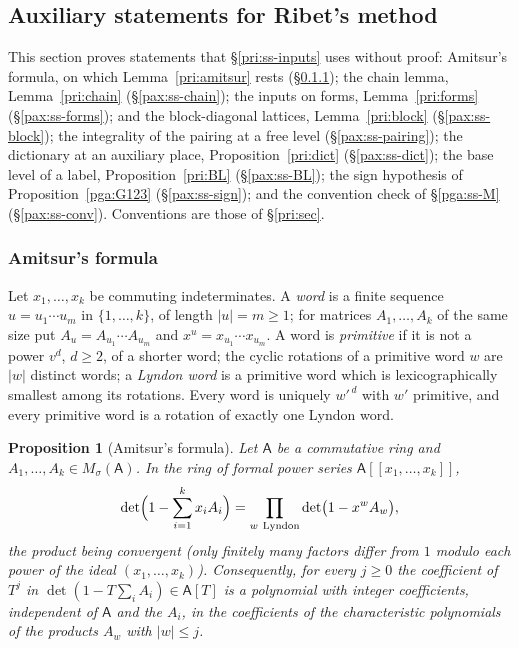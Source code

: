 \documentclass[10pt]{amsart}
\newtheorem{proposition}[theorem]{Proposition}
\theoremstyle{definition}
\theoremstyle{remark}
\begin{document}
\subsection{Auxiliary statements for Ribet's method}\label{pax:sec}

This section proves statements that \S\ref{pri:ss-inputs} uses without proof:
Amitsur's formula, on which Lemma~\ref{pri:amitsur} rests (\S\ref{pax:ss-amitsur}); the chain
lemma, Lemma~\ref{pri:chain} (\S\ref{pax:ss-chain}); the inputs on forms, Lemma~\ref{pri:forms}
(\S\ref{pax:ss-forms}); and the block-diagonal lattices, Lemma~\ref{pri:block}
(\S\ref{pax:ss-block}); the integrality of the pairing at a free level (\S\ref{pax:ss-pairing}); the
dictionary at an auxiliary place, Proposition~\ref{pri:dict} (\S\ref{pax:ss-dict}); the base level of a label,
Proposition~\ref{pri:BL} (\S\ref{pax:ss-BL}); the sign hypothesis of Proposition~\ref{pga:G123}
(\S\ref{pax:ss-sign}); and the convention check of \S\ref{pga:ss-M} (\S\ref{pax:ss-conv}). Conventions are those of \S\ref{pri:sec}.

\subsubsection{Amitsur's formula}\label{pax:ss-amitsur}

Let $x_1,\dots,x_k$ be commuting indeterminates. A \emph{word} is a finite sequence $u=u_1\cdots
u_m$ in $\{1,\dots,k\}$, of length $|u|=m\ge1$; for matrices $A_1,\dots,A_k$ of the same size put
$A_u=A_{u_1}\cdots A_{u_m}$ and $x^u=x_{u_1}\cdots x_{u_m}$. A word is \emph{primitive} if it is not
a power $v^d$, $d\ge2$, of a shorter word; the cyclic rotations of a primitive word $w$ are $|w|$
distinct words; a \emph{Lyndon word} is a primitive word which is lexicographically smallest among
its rotations. Every word is uniquely $w'^{\,d}$ with $w'$ primitive, and every primitive word is a
rotation of exactly one Lyndon word.

\begin{proposition}[Amitsur's formula]\label{pax:amitsur}
Let $\mathsf A$ be a commutative ring and $A_1,\dots,A_k\in M_\sigma(\mathsf A)$. In the ring of
formal power series $\mathsf A[[x_1,\dots,x_k]]$,
\begin{equation}\label{pax:eq-amitsur}
\det\Bigl(1-\sum_{i=1}^kx_iA_i\Bigr)=\prod_{w\ \mathrm{Lyndon}}\det\bigl(1-x^wA_w\bigr),
\end{equation}
the product being convergent (only finitely many factors differ from $1$ modulo each power of the
ideal $(x_1,\dots,x_k)$). Consequently, for every $j\ge0$ the coefficient of $T^j$ in $\det(1-T\sum_i
A_i)\in\mathsf A[T]$ is a polynomial with integer coefficients, independent of $\mathsf A$ and the
$A_i$, in the coefficients of the characteristic polynomials of the products $A_w$ with $|w|\le j$.
\end{proposition}
\end{document}
